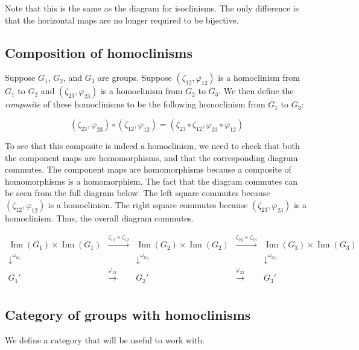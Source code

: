 Note that this is the same as the diagram for isoclinisms. The only difference is that the horizontal maps are no longer required to be bijective.

\subsection{Composition of homoclinisms}\label{sec:homoclinism-composition}

Suppose $G_1$, $G_2$, and $G_3$ are groups. Suppose
$(\zeta_{12},\varphi_{12})$ is a homoclinism from $G_1$ to $G_2$ and
$(\zeta_{23},\varphi_{23})$ is a homoclinism from $G_2$ to $G_3$. We
then define the {\em composite} of these homoclinisms to be the
following homoclinism from $G_1$ to $G_3$:

$$(\zeta_{23},\varphi_{23}) \circ (\zeta_{12},\varphi_{12}) = (\zeta_{23}\circ \zeta_{12}, \varphi_{23} \circ \varphi_{12})$$

To see that this composite is indeed a homoclinism, we need to check
that both the component maps are homomorphisms, and that the
corresponding diagram commutes. The component maps are homomorphisms
because a composite of homomorphisms is a homomorphism. The fact that
the diagram commutes can be seen from the full diagram below. The left
square commutes because $(\zeta_{12},\varphi_{12})$ is a
homoclinism. The right square commutes because
$(\zeta_{23},\varphi_{23})$ is a homoclinism. Thus, the overall
diagram commutes.

$$\begin{array}{ccccc}
  \operatorname{Inn}(G_1) \times \operatorname{Inn}(G_1) & \stackrel{\zeta_{12} \times \zeta_{12}}{\to} & \operatorname{Inn}(G_2) \times \operatorname{Inn}(G_2) & \stackrel{\zeta_{23} \times \zeta_{23}}{\to} & \operatorname{Inn}(G_3) \times \operatorname{Inn}(G_3)\\
  \downarrow^{\omega_{G_1}}  & & \downarrow^{\omega_{G_2}} & & \downarrow^{\omega_{G_3}}\\
  G_1' & \stackrel{\varphi_{12}}{\to} & G_2' & \stackrel{\varphi_{23}}{\to} & G_3'\\
\end{array}$$

\subsection{Category of groups with homoclinisms}\label{sec:homoclinism-category}

We define a category that will be useful to work with.

